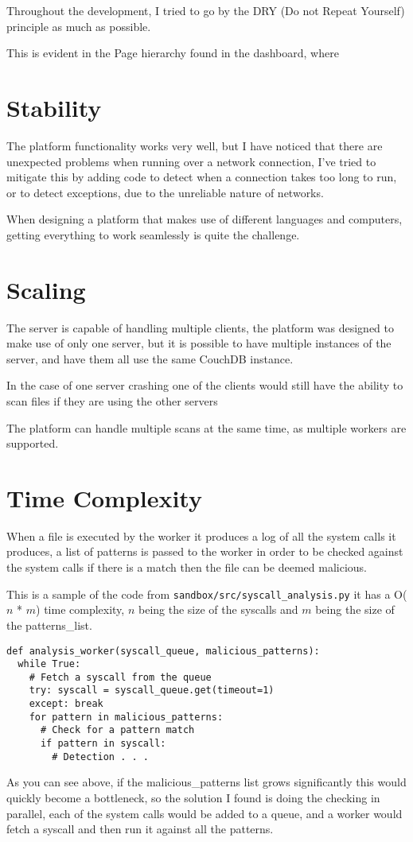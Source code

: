 Throughout the development, I tried to go by the DRY
(Do not Repeat Yourself) principle as much as possible.

This is evident in the Page hierarchy found in the dashboard,
where 

\section{Stability}
The platform functionality works very well, but I have noticed that there are unexpected problems when running over a network connection, I've tried to mitigate this by adding code to detect when a connection takes too long to run, or to detect exceptions, due to the unreliable nature of networks.

When designing a platform that makes use of different languages and computers, getting everything to work seamlessly is quite the challenge.

\section{Scaling}
The server is capable of handling multiple clients,
the platform was designed to make use of only one server,
but it is possible to have multiple instances of the server,
and have them all use the same CouchDB instance.

In the case of one server crashing one of the clients would still have the ability to scan files if they are using the other servers

The platform can handle multiple scans at the same time, as multiple workers are supported.

\section{Time Complexity}
When a file is executed by the worker it produces a log of all the
system calls it produces, a list of patterns is passed to
the worker in order to be checked against the system calls
if there is a match then the file can be deemed malicious.

This is a sample of the code from \texttt{sandbox/src/syscall\_analysis.py}
it has a O($n$ * $m$) time complexity, $n$ being the size of the syscalls
and $m$ being the size of the patterns\_list.
\begin{lstlisting}
def analysis_worker(syscall_queue, malicious_patterns):
  while True:
    # Fetch a syscall from the queue
    try: syscall = syscall_queue.get(timeout=1)
    except: break
    for pattern in malicious_patterns:
      # Check for a pattern match
      if pattern in syscall:
        # Detection . . .
\end{lstlisting}

As you can see above, if the malicious\_patterns list grows
significantly this would quickly become a bottleneck,
so the solution I found is doing the checking in parallel,
each of the system calls would be added to a queue,
and a worker would fetch a syscall and then run it against all the patterns.